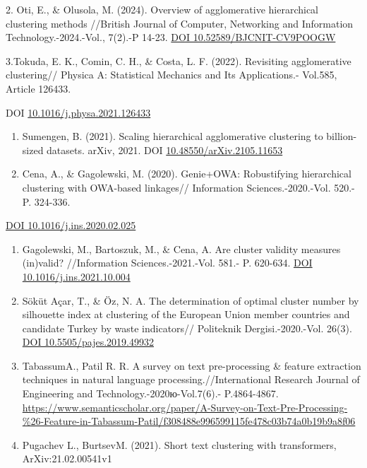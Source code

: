 2. Oti, E., \& Olusola, M. (2024). Overview of agglomerative
hierarchical clustering methods //British Journal of Computer,
Networking and Information Technology.-2024.-Vol., 7(2).-P 14-23.
\href{https://doi.org/10.52589/BJCNIT-CV9POOGW}{DOI
10.52589/BJCNIT-CV9POOGW}

3.Tokuda, E. K., Comin, C. H., \& Costa, L. F. (2022). Revisiting
agglomerative clustering// Physica A: Statistical Mechanics and Its
Applications.- Vol.585, Article 126433.

DOI
\href{https://doi.org/10.1016/j.physa.2021.126433}{10.1016/j.physa.2021.126433}

\begin{enumerate}
\def\labelenumi{\arabic{enumi}.}
\setcounter{enumi}{1}
\item
  Sumengen, B. (2021). Scaling hierarchical agglomerative clustering to
  billion-sized datasets. arXiv, 2021. DOI
  \href{https://doi.org/10.48550/arXiv.2105.11653}{10.48550/arXiv.2105.11653}
\item
  Cena, A., \& Gagolewski, M. (2020). Genie+OWA: Robustifying
  hierarchical clustering with OWA-based linkages// Information
  Sciences.-2020.-Vol. 520.-P. 324-336.
\end{enumerate}

\href{https://doi.org/10.1016/j.ins.2020.02.025}{DOI
10.1016/j.ins.2020.02.025}

\begin{enumerate}
\def\labelenumi{\arabic{enumi}.}
\setcounter{enumi}{3}
\item
  Gagolewski, M., Bartoszuk, M., \& Cena, A. Are cluster validity
  measures (in)valid? //Information Sciences.-2021.-Vol. 581.- P.
  620-634. \href{https://doi.org/10.1016/j.ins.2021.10.004}{DOI
  10.1016/j.ins.2021.10.004}
\item
  Söküt Açar, T., \& Öz, N. A. The determination of optimal cluster
  number by silhouette index at clustering of the European Union member
  countries and candidate Turkey by waste indicators// Politeknik
  Dergisi.-2020.-Vol. 26(3).
  \href{https://doi.org/10.5505/pajes.2019.49932}{DOI
  10.5505/pajes.2019.49932}
\item
  TabassumA., Patil R. R. A survey on text pre-processing \& feature
  extraction techniques in natural language processing.//International
  Research Journal of Engineering and Technology.-2020ю-Vol.7(6).-
  P.4864-4867.
  \url{https://www.semanticscholar.org/paper/A-Survey-on-Text-Pre-Processing-\%26-Feature-in-Tabassum-Patil/f308488e996599115fe478c03b74a0b19b9a8f06}
\item
  Pugachev L., BurtsevM. (2021). Short text clustering with
  transformers, ArXiv:21.02.00541v1
\end{enumerate}

